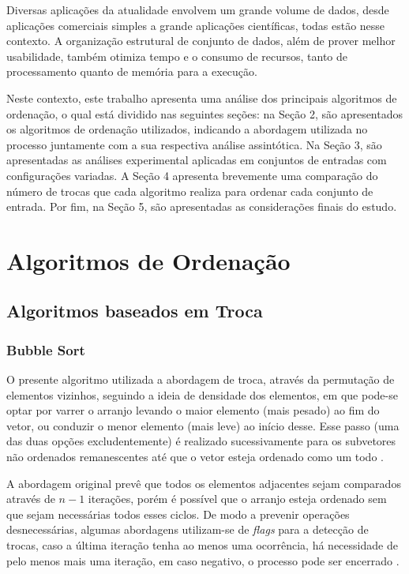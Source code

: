 \documentclass[conference,onecolumn]{IEEEtran}
\begin{document}
Diversas aplicações da atualidade envolvem um grande volume de dados, desde aplicações comerciais simples a grande aplicações científicas, todas estão nesse contexto. A organização estrutural de conjunto de dados, além de prover melhor usabilidade, também otimiza tempo e o consumo de recursos, tanto de processamento quanto de memória para a execução.

Neste contexto, este trabalho apresenta uma análise dos principais algoritmos de ordenação, o qual está dividido nas seguintes seções: na Seção 2, são apresentados os algoritmos de ordenação utilizados, indicando a abordagem utilizada no processo juntamente com a sua respectiva análise assintótica. Na Seção 3, são apresentadas as análises experimental aplicadas em conjuntos de entradas com configurações variadas. A Seção 4 apresenta brevemente uma comparação do número de trocas que cada algoritmo realiza para ordenar cada conjunto de entrada. Por fim, na Seção 5, são apresentadas as considerações finais do estudo.


\section{Algoritmos de Ordenação}


\subsection{Algoritmos baseados em Troca}


\subsubsection{Bubble Sort}

O presente algoritmo utilizada a abordagem de troca, através da permutação de elementos vizinhos, seguindo a ideia de densidade dos elementos, em que pode-se optar por varrer o arranjo levando o maior elemento (mais pesado) ao fim do vetor, ou conduzir o menor elemento (mais leve) ao início desse. Esse passo (uma das duas opções excludentemente) é realizado sucessivamente para os subvetores não ordenados remanescentes até que o vetor esteja ordenado como um todo \cite{biggar}.

A abordagem original prevê que todos os elementos adjacentes sejam comparados através de $n - 1$ iterações, porém é possível que o arranjo esteja ordenado sem que sejam necessárias todos esses ciclos. De modo a prevenir operações desnecessárias, algumas abordagens utilizam-se de \textit{flags} para a detecção de trocas, caso a última iteração tenha ao menos uma ocorrência, há necessidade de pelo menos mais uma iteração, em caso negativo, o processo pode ser encerrado \cite{biggar}.
\end{document}
